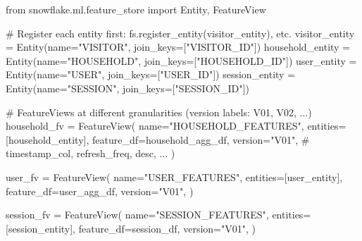 \documentclass[
  letterpaper,
  DIV=11,
  numbers=noendperiod]{scrreprt}
\newenvironment{Shaded}{\begin{snugshade}}{\end{snugshade}}
\newcommand{\CommentTok}[1]{\textcolor[rgb]{0.37,0.37,0.37}{#1}}
\newcommand{\ImportTok}[1]{\textcolor[rgb]{0.00,0.46,0.62}{#1}}
\newcommand{\NormalTok}[1]{\textcolor[rgb]{0.00,0.23,0.31}{#1}}
\newcommand{\OperatorTok}[1]{\textcolor[rgb]{0.37,0.37,0.37}{#1}}
\newcommand{\StringTok}[1]{\textcolor[rgb]{0.13,0.47,0.30}{#1}}
\begin{document}
\begin{Shaded}
\begin{Highlighting}[]
\ImportTok{from}\NormalTok{ snowflake.ml.feature\_store }\ImportTok{import}\NormalTok{ Entity, FeatureView}

\CommentTok{\# Register each entity first: fs.register\_entity(visitor\_entity), etc.}
\NormalTok{visitor\_entity }\OperatorTok{=}\NormalTok{ Entity(name}\OperatorTok{=}\StringTok{"VISITOR"}\NormalTok{, join\_keys}\OperatorTok{=}\NormalTok{[}\StringTok{"VISITOR\_ID"}\NormalTok{])}
\NormalTok{household\_entity }\OperatorTok{=}\NormalTok{ Entity(name}\OperatorTok{=}\StringTok{"HOUSEHOLD"}\NormalTok{, join\_keys}\OperatorTok{=}\NormalTok{[}\StringTok{"HOUSEHOLD\_ID"}\NormalTok{])}
\NormalTok{user\_entity }\OperatorTok{=}\NormalTok{ Entity(name}\OperatorTok{=}\StringTok{"USER"}\NormalTok{, join\_keys}\OperatorTok{=}\NormalTok{[}\StringTok{"USER\_ID"}\NormalTok{])}
\NormalTok{session\_entity }\OperatorTok{=}\NormalTok{ Entity(name}\OperatorTok{=}\StringTok{"SESSION"}\NormalTok{, join\_keys}\OperatorTok{=}\NormalTok{[}\StringTok{"SESSION\_ID"}\NormalTok{])}

\CommentTok{\# FeatureViews at different granularities (version labels: V01, V02, ...)}
\NormalTok{household\_fv }\OperatorTok{=}\NormalTok{ FeatureView(}
\NormalTok{    name}\OperatorTok{=}\StringTok{"HOUSEHOLD\_FEATURES"}\NormalTok{,}
\NormalTok{    entities}\OperatorTok{=}\NormalTok{[household\_entity],}
\NormalTok{    feature\_df}\OperatorTok{=}\NormalTok{household\_agg\_df,}
\NormalTok{    version}\OperatorTok{=}\StringTok{"V01"}\NormalTok{,}
    \CommentTok{\# timestamp\_col, refresh\_freq, desc, ...}
\NormalTok{)}

\NormalTok{user\_fv }\OperatorTok{=}\NormalTok{ FeatureView(}
\NormalTok{    name}\OperatorTok{=}\StringTok{"USER\_FEATURES"}\NormalTok{,}
\NormalTok{    entities}\OperatorTok{=}\NormalTok{[user\_entity],}
\NormalTok{    feature\_df}\OperatorTok{=}\NormalTok{user\_agg\_df,}
\NormalTok{    version}\OperatorTok{=}\StringTok{"V01"}\NormalTok{,}
\NormalTok{)}

\NormalTok{session\_fv }\OperatorTok{=}\NormalTok{ FeatureView(}
\NormalTok{    name}\OperatorTok{=}\StringTok{"SESSION\_FEATURES"}\NormalTok{,}
\NormalTok{    entities}\OperatorTok{=}\NormalTok{[session\_entity],}
\NormalTok{    feature\_df}\OperatorTok{=}\NormalTok{session\_df,}
\NormalTok{    version}\OperatorTok{=}\StringTok{"V01"}\NormalTok{,}
\NormalTok{)}
\end{Highlighting}
\end{Shaded}
\end{document}
